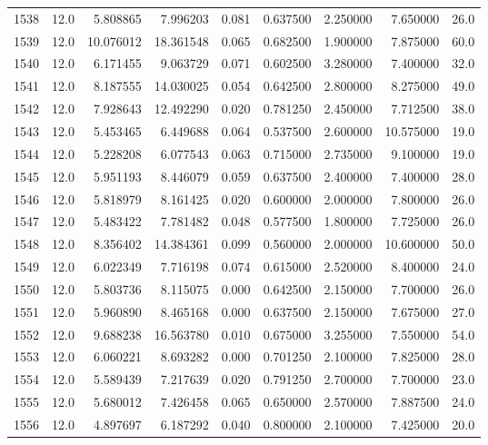 \begin{tabular}{lrrrrrrrr}
1538 &   12.0 &   5.808865 &   7.996203 &  0.081 &  0.637500 &  2.250000 &   7.650000 &   26.0 \\
1539 &   12.0 &  10.076012 &  18.361548 &  0.065 &  0.682500 &  1.900000 &   7.875000 &   60.0 \\
1540 &   12.0 &   6.171455 &   9.063729 &  0.071 &  0.602500 &  3.280000 &   7.400000 &   32.0 \\
1541 &   12.0 &   8.187555 &  14.030025 &  0.054 &  0.642500 &  2.800000 &   8.275000 &   49.0 \\
1542 &   12.0 &   7.928643 &  12.492290 &  0.020 &  0.781250 &  2.450000 &   7.712500 &   38.0 \\
1543 &   12.0 &   5.453465 &   6.449688 &  0.064 &  0.537500 &  2.600000 &  10.575000 &   19.0 \\
1544 &   12.0 &   5.228208 &   6.077543 &  0.063 &  0.715000 &  2.735000 &   9.100000 &   19.0 \\
1545 &   12.0 &   5.951193 &   8.446079 &  0.059 &  0.637500 &  2.400000 &   7.400000 &   28.0 \\
1546 &   12.0 &   5.818979 &   8.161425 &  0.020 &  0.600000 &  2.000000 &   7.800000 &   26.0 \\
1547 &   12.0 &   5.483422 &   7.781482 &  0.048 &  0.577500 &  1.800000 &   7.725000 &   26.0 \\
1548 &   12.0 &   8.356402 &  14.384361 &  0.099 &  0.560000 &  2.000000 &  10.600000 &   50.0 \\
1549 &   12.0 &   6.022349 &   7.716198 &  0.074 &  0.615000 &  2.520000 &   8.400000 &   24.0 \\
1550 &   12.0 &   5.803736 &   8.115075 &  0.000 &  0.642500 &  2.150000 &   7.700000 &   26.0 \\
1551 &   12.0 &   5.960890 &   8.465168 &  0.000 &  0.637500 &  2.150000 &   7.675000 &   27.0 \\
1552 &   12.0 &   9.688238 &  16.563780 &  0.010 &  0.675000 &  3.255000 &   7.550000 &   54.0 \\
1553 &   12.0 &   6.060221 &   8.693282 &  0.000 &  0.701250 &  2.100000 &   7.825000 &   28.0 \\
1554 &   12.0 &   5.589439 &   7.217639 &  0.020 &  0.791250 &  2.700000 &   7.700000 &   23.0 \\
1555 &   12.0 &   5.680012 &   7.426458 &  0.065 &  0.650000 &  2.570000 &   7.887500 &   24.0 \\
1556 &   12.0 &   4.897697 &   6.187292 &  0.040 &  0.800000 &  2.100000 &   7.425000 &   20.0 \\

\end{tabular}
